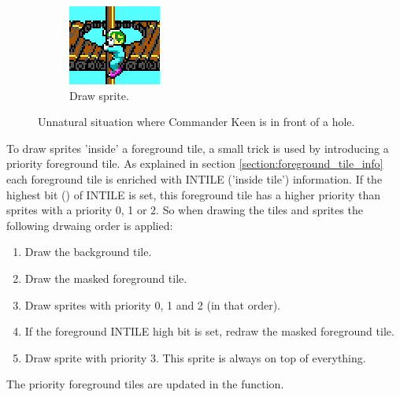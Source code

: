 \documentclass[book.tex]{subfiles}
\begin{document}
\begin{figure}[H]
\begin{subfigure}{.25\textwidth}
  \includegraphics[width=.9\textwidth]{screenshots_300dpi/game/tile_composite_3.png}
  \caption{Draw sprite.}
\end{subfigure}
\caption{Unnatural situation where Commander Keen is in front of a hole.}
\label{fig:draw_layers}
\end{figure}
\par

To draw sprites 'inside' a foreground tile, a small trick is used by introducing a priority foreground tile. As explained in section \ref{section:foreground_tile_info} each foreground tile is enriched with INTILE ('inside tile') information. If the highest bit () of INTILE is set, this foreground tile has a higher priority than sprites with a priority 0, 1 or 2. So when drawing the tiles and sprites the following drwaing order is applied:
\begin{enumerate}
  \item Draw the background tile.
  \item Draw the masked foreground tile.
  \item Draw sprites with priority 0, 1 and 2 (in that order).
  \item If the foreground INTILE high bit is set, redraw the masked foreground tile.
  \item Draw sprite with priority 3. This sprite is always on top of everything.
\end{enumerate}
\par
The priority foreground tiles are updated in the  function.\\
\end{document}
